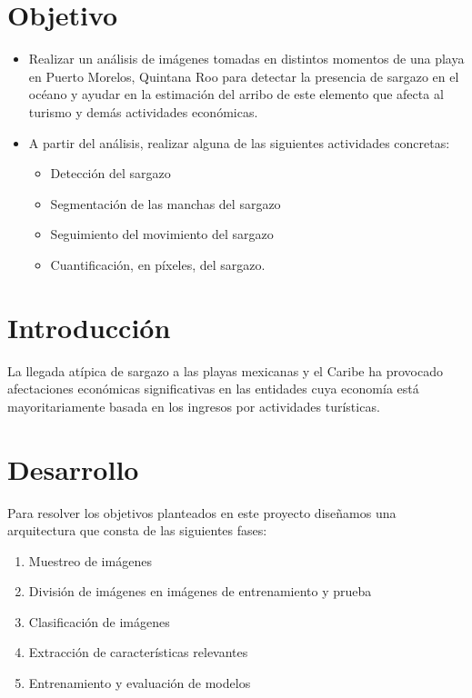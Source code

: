 \documentclass[conference]{IEEEtran}
\begin{document}
\section{Objetivo}
\begin{itemize}
    \item Realizar un análisis de imágenes tomadas en distintos momentos de una playa en Puerto Morelos, Quintana Roo para detectar la presencia de sargazo en el océano y ayudar en la estimación del arribo de este elemento que afecta al turismo y demás actividades económicas.
    \item A partir del análisis, realizar alguna de las siguientes actividades concretas:
    \begin{itemize}
        \item Detección del sargazo
        \item Segmentación de las manchas del sargazo
        \item Seguimiento del movimiento del sargazo
        \item Cuantificación, en píxeles, del sargazo.
    \end{itemize}
\end{itemize}

\section{Introducción}

La llegada atípica de sargazo a las playas mexicanas y el Caribe ha provocado afectaciones económicas significativas en las entidades cuya economía está mayoritariamente basada en los ingresos por actividades turísticas. 


\section{Desarrollo}
Para resolver los objetivos planteados en este proyecto diseñamos una arquitectura que consta de las siguientes fases:

\begin{enumerate}
    \item Muestreo de imágenes
    \item División de imágenes en imágenes de entrenamiento y prueba
    \item Clasificación de imágenes
    \item Extracción de características relevantes
    \item Entrenamiento y evaluación de modelos 
\end{enumerate}
\end{document}
